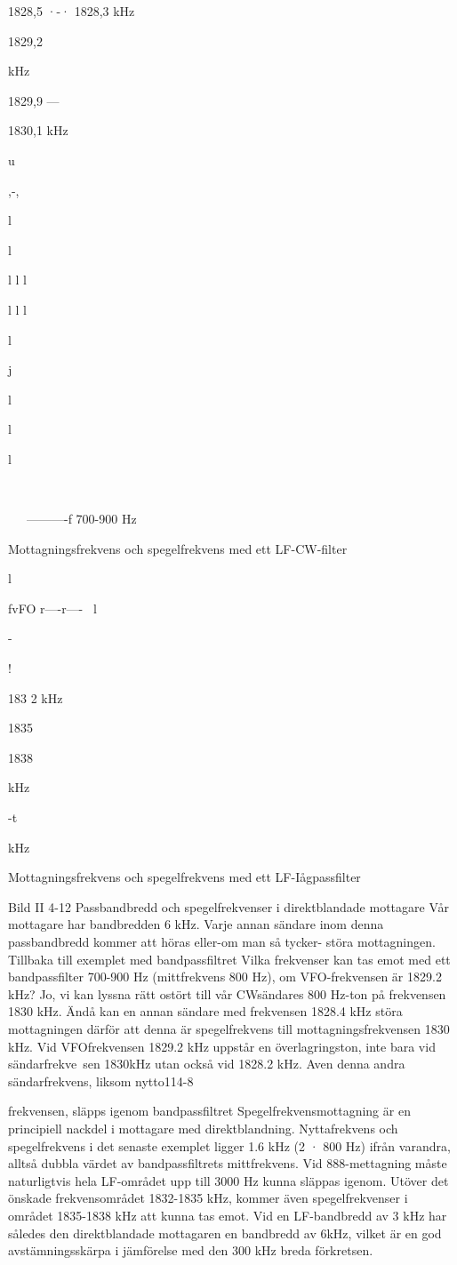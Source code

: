 1828,5 ·-·
1828,3 kHz

1829,2

kHz

1829,9 ---

1830,1 kHz

u

,-,

l

l

l
l
l

l
l
l

l

j

l

l

l

\

~~~----------f
700-900 Hz

Mottagningsfrekvens och spegelfrekvens
med ett LF-CW-filter

l

fvFO
r----r----~
l

-

!

183 2
kHz

1835

1838

kHz

-t

kHz

Mottagningsfrekvens och spegelfrekvens
med ett LF-Iågpassfilter

Bild II 4-12 Passbandbredd och spegelfrekvenser i direktblandade mottagare
Vår mottagare har bandbredden 6 kHz.
Varje annan sändare inom denna passbandbredd kommer att höras eller-om man
så tycker- störa mottagningen.
Tillbaka till exemplet med bandpassfiltret
Vilka frekvenser kan tas emot med ett
bandpassfilter 700-900 Hz (mittfrekvens 800
Hz), om VFO-frekvensen är 1829.2 kHz?
Jo, vi kan lyssna rätt ostört till vår CWsändares 800 Hz-ton på frekvensen 1830
kHz. Ändå kan en annan sändare med
frekvensen 1828.4 kHz störa mottagningen
därför att denna är spegelfrekvens till mottagningsfrekvensen 1830 kHz. Vid VFOfrekvensen 1829.2 kHz uppstår en överlagringston, inte bara vid sändarfrekve~sen
1830kHz utan också vid 1828.2 kHz. Aven
denna andra sändarfrekvens, liksom nytto114-8

frekvensen, släpps igenom bandpassfiltret
Spegelfrekvensmottagning är en principiell nackdel i mottagare med direktblandning. Nyttafrekvens och spegelfrekvens i
det senaste exemplet ligger 1.6 kHz (2 · 800
Hz) ifrån varandra, alltså dubbla värdet av
bandpassfiltrets mittfrekvens.
Vid 888-mettagning måste naturligtvis
hela LF-området upp till 3000 Hz kunna
släppas igenom. Utöver det önskade frekvensområdet 1832-1835 kHz, kommer även
spegelfrekvenser i området 1835-1838 kHz
att kunna tas emot.
Vid en LF-bandbredd av 3 kHz har således den direktblandade mottagaren en bandbredd av 6kHz, vilket är en god avstämningsskärpa i jämförelse med den 300 kHz breda
förkretsen.

